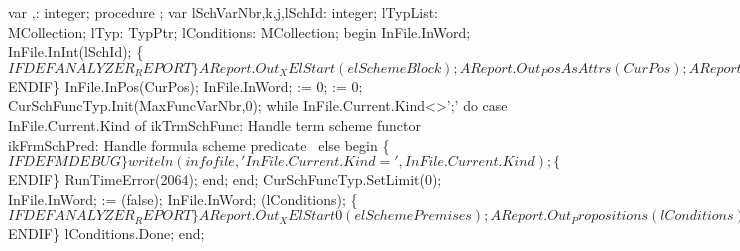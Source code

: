 var ,: integer;
procedure ;
var
   lSchVarNbr,k,j,lSchId: integer;
   lTypList: MCollection;
   lTyp: TypPtr;
   lConditions: MCollection;
begin
   InFile.InWord;
   InFile.InInt(lSchId);
   \{$IFDEF ANALYZER_REPORT\}
   AReport.Out_XElStart(elSchemeBlock);
   AReport.Out_PosAsAttrs(CurPos);
   AReport.Out_XIntAttr(atSchemeNr, InFile.Current.Nr);
   AReport.Out_XIntAttr(atVid, lSchId);
   AReport.Out_XAttrEnd;
   \{$ENDIF\}
   InFile.InPos(CurPos);
   InFile.InWord;
    := 0;
    := 0;
   CurSchFuncTyp.Init(MaxFuncVarNbr,0);
   while InFile.Current.Kind<>';' do
      case InFile.Current.Kind of
         ikTrmSchFunc:
            \LA{}Handle term scheme functor~{\nwtagstyle{}}\RA{}
         ikFrmSchPred:
            \LA{}Handle formula scheme predicate~{\nwtagstyle{}}\RA{}
      else
      begin
         \{$IFDEF MDEBUG\}
         writeln(infofile,'InFile.Current.Kind=',InFile.Current.Kind);
         \{$ENDIF\}
         RunTimeError(2064);
      end;
      end;
   CurSchFuncTyp.SetLimit(0);
   InFile.InWord;
    := (false);
   InFile.InWord;
   (lConditions);
   \{$IFDEF ANALYZER_REPORT\}
   AReport.Out_XElStart0(elSchemePremises);
   AReport.Out_Propositions(lConditions);
   AReport.Out_XElEnd(elSchemePremises);
   \{$ENDIF\}
   lConditions.Done;
end;
\eatline
{}\nwendcode{}\nwdocspar
